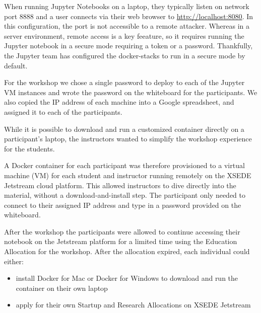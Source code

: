 When running Jupyter Notebooks on a laptop, they typically listen on network
port 8888 and a user connects via their web browser to
\url{http://localhost:8080}. In this configuration, the port is not accessible
to a remote attacker. Whereas in a server environment, remote access is a key
feeature, so it requires running the Jupyter notebook in a secure mode requiring
a token or a password. Thankfully, the Jupyter team has configured the
docker-stacks to run in a secure mode by default.

For the workshop we chose a single password to deploy to each of the Jupyter VM
instances and wrote the password on the whiteboard for the participants. We also
copied the IP address of each machine into a Google spreadsheet, and assigned it to
each of the participants.

While it is possible to download and run a customized container directly on a
participant’s laptop, the instructors wanted to simplify the workshop
experience for the students.

A Docker container for each participant was therefore provisioned to
a virtual machine (VM) for each student and instructor running remotely on the
XSEDE Jetstream cloud platform. This allowed instructors to dive directly into
the material, without a download-and-install step. The participant only needed
to connect to their assigned IP address and type in a password provided on the
whiteboard.

After the workshop the participants were allowed to continue accessing their
notebook on the Jetstream platform for a limited time using the Education
Allocation for the workshop. After the allocation expired, each individual could
either:

\begin{itemize}

\item install Docker for Mac or Docker for Windows to download and run the
container on their own laptop

\item apply for their own Startup and Research Allocations on XSEDE Jetstream

\end{itemize}
